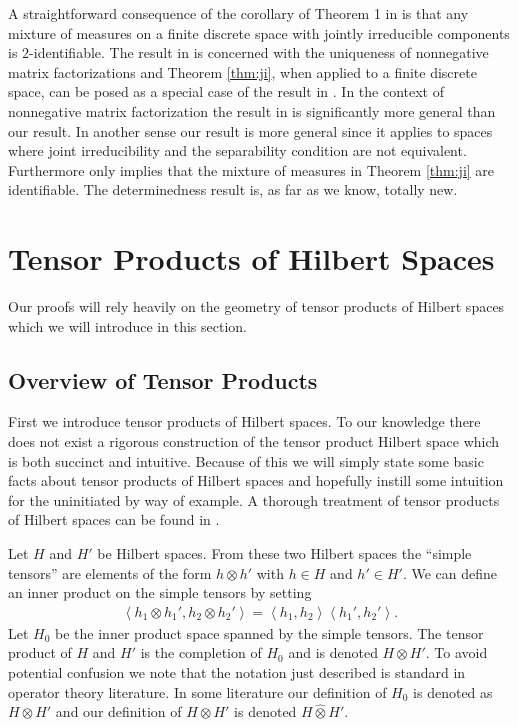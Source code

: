 \documentclass[aos,preprint]{imsart}
\def\l{\left}
\def\r{\right}
\theoremstyle{plain}
\theoremstyle{defintion}
\begin{document}
	A straightforward consequence of the corollary of Theorem 1 in \cite{donoho03} is that any mixture of measures on a finite discrete space with jointly irreducible components is $2$-identifiable. The result in \cite{donoho03} is concerned with the uniqueness of nonnegative matrix factorizations and Theorem \ref{thm:ji}, when applied to a finite discrete space, can be posed as a special case of the result in \cite{donoho03}. In the context of nonnegative matrix factorization the result in \cite{donoho03} is significantly more general than our result. In another sense our result is more general since it applies to spaces where joint irreducibility and the separability condition are not equivalent. Furthermore \cite{donoho03} only implies that the mixture of measures in Theorem \ref{thm:ji} are identifiable. The determinedness result is, as far as we know, totally new.

	\section{Tensor Products of Hilbert Spaces}\label{sec:tensorproducts}
	Our proofs will rely heavily on the geometry of tensor products of Hilbert spaces which we will introduce in this section.

	\subsection{Overview of Tensor Products}
	First we introduce tensor products of Hilbert spaces. To our knowledge there does not exist a rigorous construction of the tensor product Hilbert space which is both succinct and intuitive. Because of this we will simply state some basic facts about tensor products of Hilbert spaces and hopefully instill some intuition for the uninitiated by way of example. A thorough treatment of tensor products of Hilbert spaces can be found in \cite{kadison83}.

	Let $H$ and $H'$ be Hilbert spaces. From these two Hilbert spaces the ``simple tensors'' are elements of the form $h\otimes h'$ with $h\in H$ and $h' \in H'$. We can define an inner product on the simple tensors by setting
	\begin{eqnarray*}
		\l<h_1 \otimes h_1', h_2 \otimes h_2'\r> = \l<h_1,h_2\r>\l<h_1',h_2'\r>.
	\end{eqnarray*}
	Let $H_0$ be the inner product space spanned by the simple tensors. The tensor product of $H$ and $H'$ is the completion of $H_0$ and is denoted $H\otimes H'$. To avoid potential confusion we note that the notation just described is standard in operator theory literature. In some literature our definition of $H_0$ is denoted as $H\otimes H'$ and our definition of $H \otimes H'$ is denoted $H \widehat{\otimes} H'$.
\end{document}
